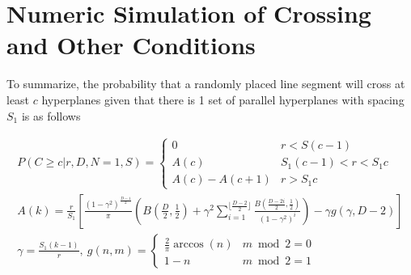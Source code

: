 \documentclass{article}
\begin{document}


\section{Numeric Simulation of Crossing and Other Conditions} \label{s:n=1 numeric}
To summarize, the probability that a randomly placed line segment will cross at least $c$
hyperplanes given that there is 1 set of parallel hyperplanes with spacing $S_1$ is as follows

\begin{gather}
	P(C\ge c | r, D, N=1, S) = \begin{cases}
		0 & r < S(c-1) \\ 
		A(c)  & S_1 (c-1) < r < S_1 c \\
		A(c) - A(c+1) & r > S_1c		
	\end{cases} \\
	A(k) = \frac{r}{S_1} \left[\frac{(1-\gamma^2)^{\frac{D-1}{2}}}{\pi} \left(B\left(\frac{D}{2}, \frac{1}{2} \right) + \gamma^2 \sum_{i=1}^{\lfloor \frac{D-2}{2} \rfloor}\frac{B(\frac{D-2i}{2}, \frac{1}{2})}{(1-\gamma^2)^i}\right) - \gamma g(\gamma, D-2) \right] \\
	\gamma = \frac{S_1(k-1)}{r},\ g(n, m) = \begin{cases}
		\frac{2}{\pi}\arccos(n) & m\bmod 2 = 0 \\
		1-n & m \bmod 2 = 1
	\end{cases}
\end{gather}
\end{document}
